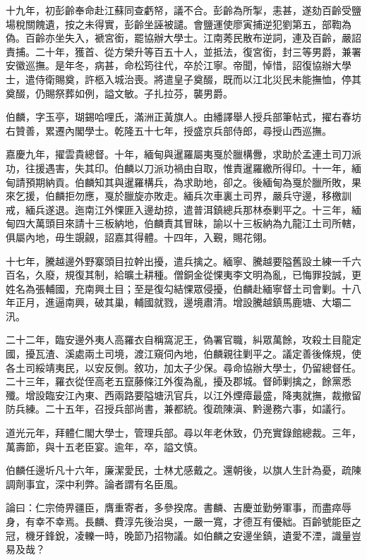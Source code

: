 \begin{pinyinscope}
十九年，初彭齡奉命赴江蘇同查虧帑，議不合。彭齡為所掣，恚甚，遂劾百齡受鹽場稅關餽遺，按之未得實，彭齡坐誣被譴。會鹽運使廖寅捕逆犯劉第五，部鞫為偽。百齡亦坐失入，褫宮銜，罷協辦大學士。江南莠民散布逆詞，連及百齡，嚴詔責捕。二十年，獲首、從方榮升等百五十人，並抵法，復宮銜，封三等男爵，兼署安徽巡撫。是年冬，病甚，命松筠往代，卒於江寧。帝聞，悼惜，詔復協辦大學士，遣侍衛賜奠，許柩入城治喪。將遣皇子奠醊，既而以江北災民未能撫恤，停其奠醊，仍賜祭葬如例，謚文敏。子扎拉芬，襲男爵。

伯麟，字玉亭，瑚錫哈哩氏，滿洲正黃旗人。由繙譯舉人授兵部筆帖式，擢右春坊右贊善，累遷內閣學士。乾隆五十七年，授盛京兵部侍郎，尋授山西巡撫。

嘉慶九年，擢雲貴總督。十年，緬甸與暹羅屬夷戛於臘構釁，求助於孟連土司刀派功，往援遇害，失其印。伯麟以刀派功禍由自取，惟責暹羅繳所得印。十一年，緬甸請預期納貢。伯麟知其與暹羅構兵，為求助地，卻之。後緬甸為戛於臘所敗，果來乞援，伯麟拒勿應，戛於臘旋亦敗走。緬兵次車裏土司界，嚴兵守邊，移檄訓戒，緬兵遂退。迤南江外惈匪入邊劫掠，遣普洱鎮總兵那林泰剿平之。十三年，緬甸四大萬頭目來請十三板納地，伯麟責其冒昧，諭以十三板納為九龍江土司所轄，俱屬內地，毋生覬覦，詔嘉其得體。十四年，入覲，賜花翎。

十七年，騰越邊外野寨頭目拉幹出擾，遣兵擒之。緬寧、騰越要隘舊設土練一千六百名，久廢，規復其制，給曠土耕種。僧銅金從惈夷李文明為亂，已悔罪投誠，更姓名為張輔國，充南興土目；至是復勾結惈眾侵擾，伯麟赴緬寧督土司會剿。十八年正月，進逼南興，破其巢，輔國就戮，邊境肅清。增設騰越鎮馬鹿塘、大壩二汛。

二十二年，臨安邊外夷人高羅衣自稱窩泥王，偽署官職，糾眾萬餘，攻殺土目龍定國，擾瓦渣、溪處兩土司境，渡江窺伺內地，伯麟親往剿平之。議定善後條規，使各土司綏靖夷民，以安反側。敘功，加太子少保。尋命協辦大學士，仍留總督任。二十三年，羅衣從侄高老五竄藤條江外復為亂，擾及郡城。督師剿擒之，餘黨悉殲。增設臨安江內東、西兩路要隘塘汛官兵，以江外煙瘴最盛，降夷就撫，裁撤留防兵練。二十五年，召授兵部尚書，兼都統。復疏陳滇、黔邊務六事，如議行。

道光元年，拜體仁閣大學士，管理兵部。尋以年老休致，仍充實錄館總裁。三年，萬壽節，與十五老臣宴。逾年，卒，謚文慎。

伯麟任邊圻凡十六年，廉潔愛民，士林尤感戴之。還朝後，以旗人生計為憂，疏陳調劑事宜，深中利弊。論者謂有名臣風。

論曰：仁宗倚畀疆臣，膺重寄者，多參揆席。書麟、吉慶並勤勞軍事，而盡瘁辱身，有幸不幸焉。長麟、費淳先後治吳，一嚴一寬，才德互有優絀。百齡號能臣之冠，機牙鋒銳，凌轢一時，晚節乃招物議。如伯麟之安邊坐鎮，遺愛不湮，識量豈易及哉？


\end{pinyinscope}